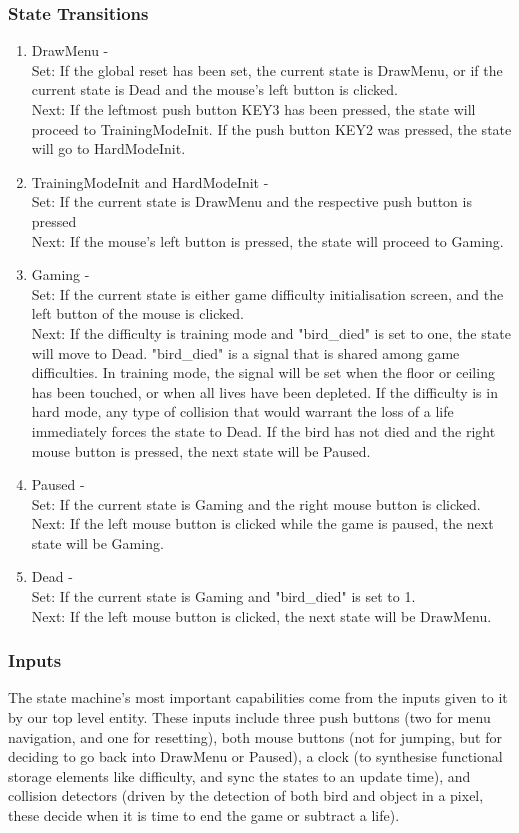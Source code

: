 \documentclass[conference]{IEEEtran}
\begin{document}
\subsubsection{State Transitions}
\begin{enumerate}
	\item DrawMenu - \\
	      Set: If the global reset has been set, the current state is DrawMenu, or if the current state is Dead and the mouse's left button is clicked. \\
	      Next: If the leftmost push button KEY3 has been pressed, the state will proceed to TrainingModeInit. If the push button KEY2 was pressed, the state will go to HardModeInit.
	\item TrainingModeInit and HardModeInit - \\
	      Set: If the current state is DrawMenu and the respective push button is pressed \\
	      Next: If the mouse's left button is pressed, the state will proceed to Gaming.
	\item Gaming - \\
	      Set: If the current state is either game difficulty initialisation screen, and the left button of the mouse is clicked. \\
	      Next: If the difficulty is training mode and "bird\_died" is set to one, the state will move to Dead. "bird\_died" is a signal that is shared among game difficulties. In training mode, the signal will be set when the floor or ceiling has been touched, or when all lives have been depleted. If the difficulty is in hard mode, any type of collision that would warrant the loss of a life immediately forces the state to Dead. If the bird has not died and the right mouse button is pressed, the next state will be Paused.
	\item Paused - \\
	      Set: If the current state is Gaming and the right mouse button is clicked. \\
	      Next: If the left mouse button is clicked while the game is paused, the next state will be Gaming.
	\item Dead - \\
	      Set: If the current state is Gaming and "bird\_died" is set to 1. \\
	      Next: If the left mouse button is clicked, the next state will be DrawMenu.
\end{enumerate}

\subsubsection{Inputs}
The state machine's most important capabilities come from the inputs given to it by our top level entity. These inputs include three push buttons (two for menu navigation, and one for resetting), both mouse buttons (not for jumping, but for deciding to go back into DrawMenu or Paused), a clock (to synthesise functional storage elements like difficulty, and sync the states to an update time), and collision detectors (driven by the detection of both bird and object in a pixel, these decide when it is time to end the game or subtract a life).
\end{document}
